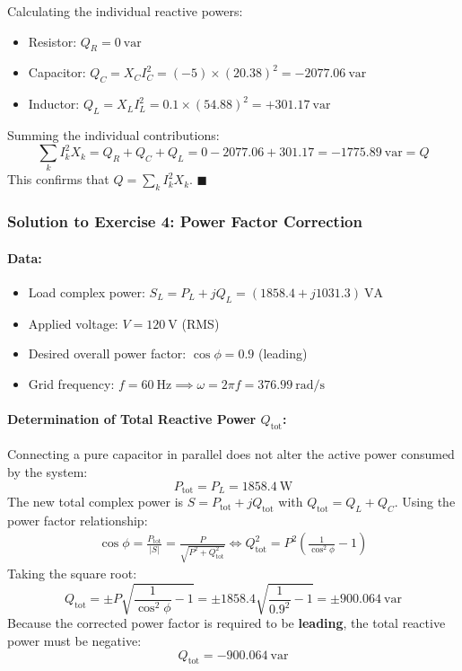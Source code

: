 Calculating the individual reactive powers:
\begin{itemize}
    \item Resistor: $Q_R = 0\ \text{var}$
    \item Capacitor: $Q_C = X_C I_C^2 = (-5) \times (20.38)^2 = -2077.06\ \text{var}$
    \item Inductor: $Q_L = X_L I_L^2 = 0.1 \times (54.88)^2 = +301.17\ \text{var}$
\end{itemize}
Summing the individual contributions:
\begin{equation}
    \sum_k I_k^2 X_k = Q_R + Q_C + Q_L = 0 - 2077.06 + 301.17 = -1775.89\ \text{var} = Q
\end{equation}
This confirms that $Q = \sum_k I_k^2 X_k$. \hfill $\blacksquare$

\subsubsection*{Solution to Exercise 4: Power Factor Correction}
\paragraph{Data:}
\begin{itemize}
    \item Load complex power: $S_L = P_L + j Q_L = (1858.4 + j1031.3)\ \text{VA}$
    \item Applied voltage: $V = 120\ \text{V}$ (RMS)
    \item Desired overall power factor: $\cos\phi = 0.9$ (leading)
    \item Grid frequency: $f = 60\ \text{Hz} \implies \omega = 2\pi f = 376.99\ \text{rad/s}$
\end{itemize}

\paragraph{Determination of Total Reactive Power $Q_{\text{tot}}$:}
Connecting a pure capacitor in parallel does not alter the active power consumed by the system:
\[
P_{\text{tot}} = P_L = 1858.4\ \text{W}
\]
The new total complex power is $S = P_{\text{tot}} + j Q_{\text{tot}}$ with $Q_{\text{tot}} = Q_L + Q_C$.
Using the power factor relationship:
\begin{align}
    \cos\phi = \frac{P_{\text{tot}}}{|S|} = \frac{P}{\sqrt{P^2 + Q_{\text{tot}}^2}} \iff Q_{\text{tot}}^2 = P^2 \left( \frac{1}{\cos^2\phi} - 1 \right)
\end{align}
Taking the square root:
\begin{equation}
    Q_{\text{tot}} = \pm P \sqrt{\frac{1}{\cos^2\phi} - 1} = \pm 1858.4 \sqrt{\frac{1}{0.9^2} - 1} = \pm 900.064\ \text{var}
\end{equation}
Because the corrected power factor is required to be \textbf{leading}, the total reactive power must be negative:
\begin{equation}
    Q_{\text{tot}} = -900.064\ \text{var}
\end{equation}

